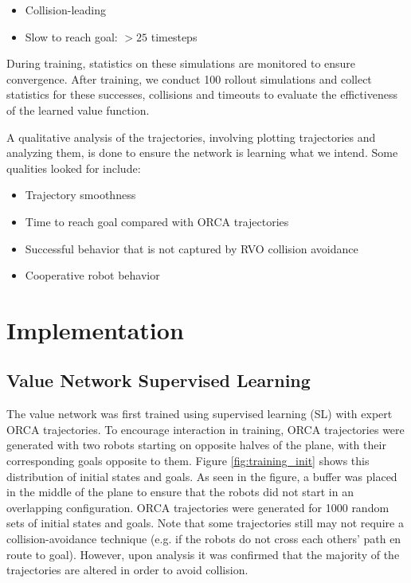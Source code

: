 \documentclass[conference]{IEEEtran}
\begin{document}
\begin{itemize}
    \item Collision-leading
    \item Slow to reach goal: $>25$ timesteps
\end{itemize}

During training, statistics on these simulations are monitored to ensure convergence. After training, we conduct 100 rollout simulations and collect statistics for these successes, collisions and timeouts to evaluate the effictiveness of the learned value function.

A qualitative analysis of the trajectories, involving plotting trajectories and analyzing them, is done to ensure the network is learning what we intend. Some qualities looked for include: 
\begin{itemize}
    \item Trajectory smoothness
    \item Time to reach goal compared with ORCA trajectories
    \item Successful behavior that is not captured by RVO collision avoidance
    \item Cooperative robot behavior
\end{itemize}
\section{Implementation}

\subsection{Value Network Supervised Learning}
The value network was first trained using supervised learning (SL) with expert ORCA trajectories. To encourage interaction in training, ORCA trajectories were generated with two robots starting on opposite halves of the plane, with their corresponding goals opposite to them. Figure \ref{fig:training_init} shows this distribution of initial states and goals. As seen in the figure, a buffer was placed in the middle of the plane to ensure that the robots did not start in an overlapping configuration. ORCA trajectories were generated for 1000 random sets of initial states and goals. Note that some trajectories still may not require a collision-avoidance technique (e.g. if the robots do not cross each others' path en route to goal). However, upon analysis it was confirmed that the majority of the trajectories are altered in order to avoid collision.
\end{document}
